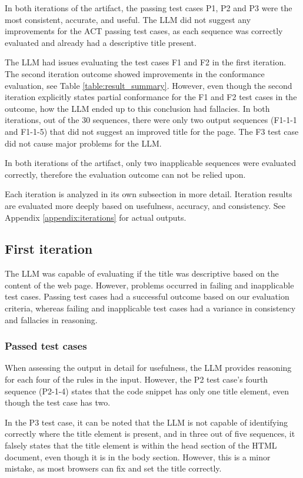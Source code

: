 In both iterations of the artifact, the passing test cases P1, P2 and P3 were the most consistent, accurate, and useful. The LLM did not suggest any improvements for the ACT passing test cases, as each sequence was correctly evaluated and already had a descriptive title present. 

The LLM had issues evaluating the test cases F1 and F2 in the first iteration. The second iteration outcome showed improvements in the conformance evaluation, see Table \ref{table:result_summary}. However, even though the second iteration explicitly states partial conformance for the F1 and F2 test cases in the outcome, how the LLM ended up to this conclusion had fallacies. In both iterations, out of the 30 sequences, there were only two output sequences (F1-1-1 and F1-1-5) that did not suggest an improved title for the page. The F3 test case did not cause major problems for the LLM.

In both iterations of the artifact, only two inapplicable sequences were evaluated correctly, therefore the evaluation outcome can not be relied upon.

Each iteration is analyzed in its own subsection in more detail. Iteration results are evaluated more deeply based on usefulness, accuracy, and consistency. See Appendix \ref{appendix:iterations} for actual outputs.

\subsection{First iteration}

The LLM was capable of evaluating if the title was descriptive based on the content of the web page. However, problems occurred in failing and inapplicable test cases. Passing test cases had a successful outcome based on our evaluation criteria, whereas failing and inapplicable test cases had a variance in consistency and fallacies in reasoning.

\subsubsection{Passed test cases}

When assessing the output in detail for usefulness, the LLM provides reasoning for each four of the rules in the input. However, the P2 test case's fourth sequence (P2-1-4) states that the code snippet has only one title element, even though the test case has two. 

In the P3 test case, it can be noted that the LLM is not capable of identifying correctly where the title element is present, and in three out of five sequences, it falsely states that the title element is within the head section of the HTML document, even though it is in the body section. However, this is a minor mistake, as most browsers can fix and set the title correctly.

